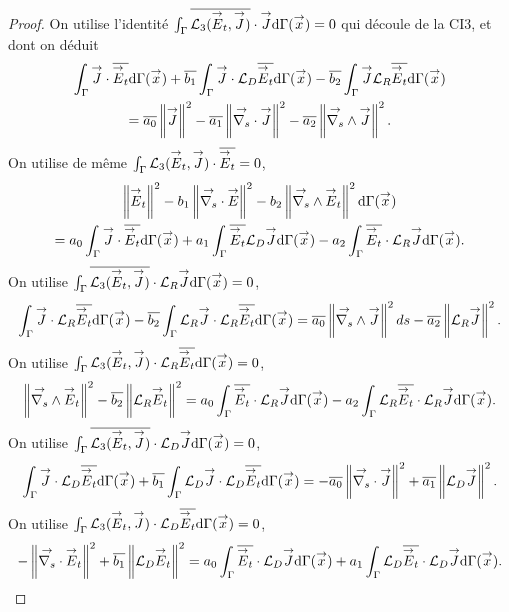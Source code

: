 \begin{proof}
    On utilise l'identité \(\int_\Gamma {\overline{\mathcal{L}_3({\overset{\rightarrow}{E}}_t,{\overset{\rightarrow}{J}})}}\cdot {\overset{\rightarrow}{J}} \mathrm{d}{\Gamma}({\overset{\rightarrow}{x}}) = 0\) qui découle de la CI3, et dont on déduit
    \begin{multline}
      \label{eq:unicite:ci3:csu3-1}
      \int_\Gamma \vJ \cdot \conj{\vE_t}\dd{\Gamma}(\vx)   + \conj{b_1} \int_\Gamma \vJ\cdot \LD\conj{\vE_t}\dd{\Gamma}(\vx)  - \conj{b_2} \int_\Gamma \vJ \LR\conj{\vE_t}\dd{\Gamma}(\vx)  \\
      = \conj{a_0} \norm{\vJ}^2 - \conj{a_1} \norm{\vdivs \vJ}^2  - \conj{a_2} \norm{\vrots \vJ}^2. 
    \end{multline}
    On utilise de même \(\int_\Gamma {\mathcal{L}_3({\overset{\rightarrow}{E}}_t,{\overset{\rightarrow}{J}})}\cdot {\overline{{\overset{\rightarrow}{E}}_t}} = 0\),
    \begin{multline}
      \label{eq:unicite:ci3:csu3-2}
      \norm{\vE_t}^2   - b_1 \norm{ \vdivs \vE }^2  - b_2 \norm{\vrots \vE_t}^2\dd{\Gamma}(\vx)  \\
      = a_0 \int_\Gamma \vJ\cdot \conj{\vE_t}\dd{\Gamma}(\vx) + a_1 \int_\Gamma \conj{\vE_t} \LD \vJ\dd{\Gamma}(\vx)  - a_2 \int_\Gamma \conj{\vE_t} \cdot \LR \vJ \dd{\Gamma}(\vx).
    \end{multline}
    On utilise \(\int_\Gamma {\overline{\mathcal{L}_3({\overset{\rightarrow}{E}}_t,{\overset{\rightarrow}{J}})}}\cdot{\mathcal{L}_R}{\overset{\rightarrow}{J}}\mathrm{d}{\Gamma}({\overset{\rightarrow}{x}}) = 0\),
    \begin{equation}
      \label{eq:unicite:ci3:csu3-3}
      \int_\Gamma \vJ \cdot \LR \conj{\vE_t}\dd{\Gamma}(\vx)   - \conj{b_2} \int_\Gamma \LR \vJ \cdot \LR \conj{\vE_t}\dd{\Gamma}(\vx)
      =  \conj{a_0} \norm{ \vrots \vJ}^2ds - \conj{a_2} \norm{ \LR \vJ}^2. 
    \end{equation}
    On utilise \(\int_\Gamma {\mathcal{L}_3({\overset{\rightarrow}{E}}_t,{\overset{\rightarrow}{J}})}\cdot{\mathcal{L}_R}{\overline{{\overset{\rightarrow}{E}}_t}}\mathrm{d}{\Gamma}({\overset{\rightarrow}{x}})=0\),
    \begin{equation}
      \label{eq:unicite:ci3:csu3-4}
      \norm{ \vrots \vE_t }^2   - \conj{b_2} \norm{ \LR \vE_t}^2 
      = a_0 \int_\Gamma \conj{\vE_t} \cdot \LR \vJ \dd{\Gamma}(\vx) - a_2 \int_\Gamma \LR \conj{\vE_t} \cdot \LR \vJ \dd{\Gamma}(\vx).
    \end{equation}
    On utilise \(\int_\Gamma {\overline{\mathcal{L}_3({\overset{\rightarrow}{E}}_t,{\overset{\rightarrow}{J}})}}\cdot{\mathcal{L}_D}{\overset{\rightarrow}{J}}\mathrm{d}{\Gamma}({\overset{\rightarrow}{x}})=0\),
    \begin{equation}
      \label{eq:unicite:ci3:csu3-5}
      \int_\Gamma \vJ \cdot \LD \conj{\vE_t}\dd{\Gamma}(\vx)   + \conj{b_1} \int_\Gamma \LD \vJ \cdot \LD \conj{\vE_t}\dd{\Gamma}(\vx)
      = - \conj{a_0} \norm{\vdivs \vJ}^2 + \conj{a_1} \norm{ \LD \vJ}^2. 
    \end{equation}
    On utilise \(\int_\Gamma {\mathcal{L}_3({\overset{\rightarrow}{E}}_t,{\overset{\rightarrow}{J}})}\cdot{\mathcal{L}_D}{\overline{{\overset{\rightarrow}{E}}_t}}\mathrm{d}{\Gamma}({\overset{\rightarrow}{x}})=0\),
    \begin{equation}
      \label{eq:unicite:ci3:csu3-6}
      -\norm{ \vdivs \vE_t }^2   + \conj{b_1} \norm{ \LD \vE_t}^2
      = a_0 \int_\Gamma \conj{\vE_t} \cdot \LD \vJ\dd{\Gamma}(\vx)  + a_1 \int_\Gamma \LD \conj{\vE_t} \cdot \LD \vJ \dd{\Gamma}(\vx).
    \end{equation}


\end{proof}
